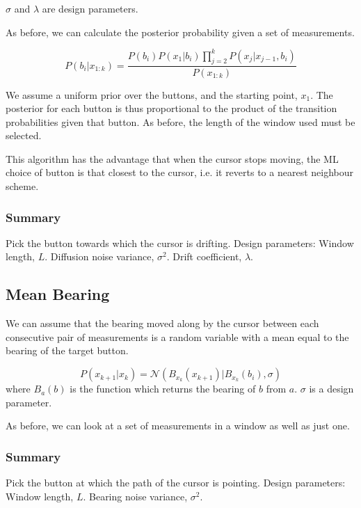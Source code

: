 $\sigma$ and $\lambda$ are design parameters.

As before, we can calculate the posterior probability given a set of measurements.

\begin{equation}
P(b_i|x_{1:k}) = \frac{P(b_i)P(x_1|b_i)\prod_{j=2}^{k}{P(x_j|x_{j-1}, b_i)}}{P(x_{1:k})}
\end{equation}

We assume a uniform prior over the buttons, and the starting point, $x_1$. The posterior for each button is thus proportional to the product of the transition probabilities given that button. As before, the length of the window used must be selected.

This algorithm has the advantage that when the cursor stops moving, the ML choice of button is that closest to the cursor, i.e. it reverts to a nearest neighbour scheme.

\subsubsection*{Summary}
Pick the button towards which the cursor is drifting.
Design parameters: Window length, $L$. Diffusion noise variance, $\sigma^2$. Drift coefficient, $\lambda$.



\subsection{Mean Bearing}
We can assume that the bearing moved along by the cursor between each consecutive pair of measurements is a random variable with a mean equal to the bearing of the target button.

\begin{equation}P(x_{k+1}|x_{k}) = \mathcal{N}(B_{x_k}(x_{k+1})|B_{x_k}(b_i), \sigma)\end{equation}
where $B_{a}(b)$ is the function which returns the bearing of $b$ from $a$. $\sigma$ is a design parameter.

As before, we can look at a set of measurements in a window as well as just one.

\subsubsection*{Summary}
Pick the button at which the path of the cursor is pointing.
Design parameters: Window length, $L$. Bearing noise variance, $\sigma^2$.




